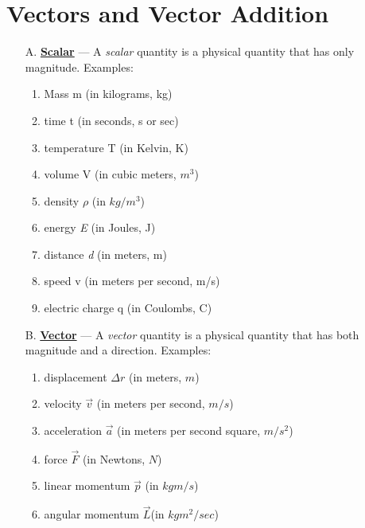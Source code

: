 \documentclass[12pt]{article}
\begin{document}
\section{Vectors and Vector Addition}
\begin{itemize}
    \item[A.] \textbf{\underline{Scalar}} — A \textit{scalar} quantity is a physical quantity that has only magnitude. Examples:
          \begin{enumerate}
              \item Mass m (in kilograms, kg)
              \item time t (in seconds, s or sec)
              \item temperature T (in Kelvin, K)
              \item volume V (in cubic meters, $m^3$)
              \item density $\rho$ (in $kg/m^3$)
              \item energy \textit{E} (in Joules, J)
              \item distance \textit{d} (in meters, m)
              \item speed v (in meters per second, m/s)
              \item electric charge q (in Coulombs, C)
          \end{enumerate}

    \item[B.] \textbf{\underline{Vector}} — A \textit{vector} quantity is a physical quantity that has both magnitude and a direction. Examples:
          \begin{enumerate}
              \item displacement $\Delta r$ (in meters, $m$)
              \item velocity $\vec{v}$ (in meters per second, $m/s$)
              \item acceleration $\vec{a}$ (in meters per second square, $m/s^2$)
              \item force $\vec{F}$ (in Newtons, $N$)
              \item linear momentum $\vec{p}$ (in $kg m/s$)
              \item angular momentum $\vec{L}$(in $kg m^2 / sec$)
          \end{enumerate}
\end{itemize}

\paragraph{}
\end{document}
